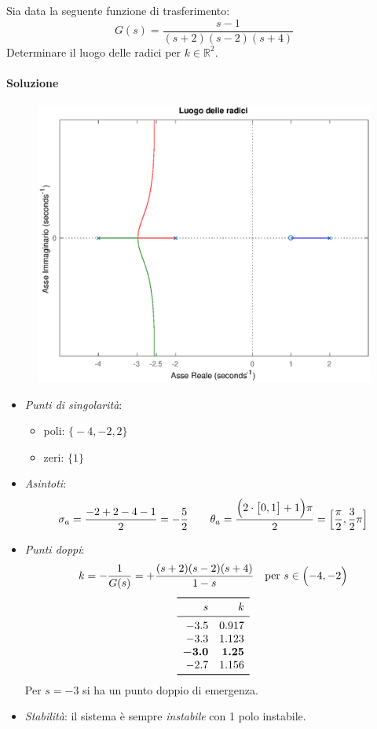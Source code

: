 \exercise{}
Sia data la seguente funzione di trasferimento:
\[
	G(s) = \frac{s-1}{(s+2)(s-2)(s+4)}
\]
Determinare il luogo delle radici per \(k\in\mathbb{R}^2\).

\paragraph{Soluzione}

\begin{figure}[ht]
	\centering
	\includegraphics[scale=.6]{mod1/assets/rl_ex39}
\end{figure}

\begin{itemize}
	\item \emph{Punti di singolarità}:
		\begin{itemize}
			\item poli: \(\bigl\{ -4,-2,2 \bigr\}\) \\
			\item zeri: \(\bigl\{ 1 \bigr\}\)
		\end{itemize}
	\item \emph{Asintoti}:
		\[
			\sigma_a = \frac{-2+2-4-1}{2} = -\frac{5}{2} \qquad
			\theta_a = \frac{\Bigl(2\cdot \bigl[0,1\bigr] +1\Bigr)\pi}{2} = \Bigl[ \frac{\pi}{2},\frac{3}{2}\pi \Bigr]
		\]
	\item \emph{Punti doppi}:
		\[
			k = -\frac{1}{G(s)} = + \frac{(s+2)(s-2)(s+4)}{1-s} \quad
			\text{per } s \in \Bigl(-4,-2\Bigr)
		\]
		\[\begin{array}{rr}
			\toprule
			s 	  & k 		\\
			\midrule
			-3.5 	  & 0.917 	\\
			-3.3 	  & 1.123 	\\
			\bm{-3.0} & \bm{1.25} 	\\
			-2.7 	  & 1.156	\\
			\bottomrule
		\end{array}\]
		Per \(s=-3\) si ha un punto doppio di emergenza.
	\item \emph{Stabilità}: il sistema è sempre \emph{instabile} con 1 polo instabile.
\end{itemize}


